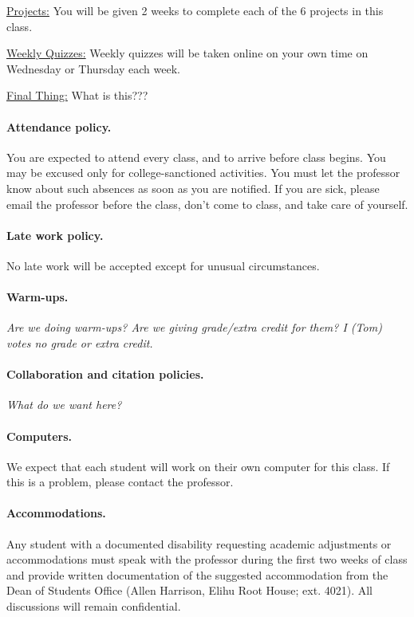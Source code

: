\documentclass[12pt]{article}
\begin{document}
\vspace{0.5cm}

\noindent
\underline{Projects:} You will be given 2 weeks to complete each of the 6 projects in this class.

\vspace{0.5cm}

\noindent
\underline{Weekly Quizzes:} Weekly quizzes will be taken online on your own time on Wednesday or Thursday each week.

\vspace{0.5cm}

\noindent
\underline{Final Thing:} What is this???


\paragraph*{Attendance policy.}You are expected to attend every class, and to arrive before class begins. You may be excused only for college-sanctioned activities.  You must let the professor know about such absences as soon as you are notified.
If you are sick, please email the professor before the class, don't come to class, and take care of yourself.

\paragraph*{Late work policy.} No late work will be accepted except for unusual circumstances.

\paragraph*{Warm-ups.} \textit{Are we doing warm-ups? Are we giving grade/extra credit for them? I (Tom) votes no grade or extra credit.}

\paragraph*{Collaboration and citation policies.} \textit{What do we want here?}

\paragraph*{Computers.} We expect that each student will work on their own computer for this class. If this is a problem, please contact the professor.

\paragraph*{Accommodations.} Any student with a documented disability requesting academic adjustments or accommodations must speak with the professor during the first two weeks of class and provide written documentation of the suggested accommodation from the Dean of Students Office (Allen Harrison, Elihu Root House; ext. 4021). All discussions will remain confidential.
\end{document}
